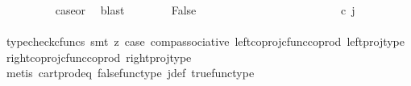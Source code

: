 \begin{isabellebody}
\ \ \ \ \ \ \ \ \isamarkupfalse%
\ case{}{\isacharunderscore}{\kern0pt}or{\isacharunderscore}{\kern0pt}{}\ \isamarkupfalse%
\ blast\isanewline
\ \ \ \ \ \ \isamarkupfalse%
\ False\isanewline
\ \ \ \ \ \ \isamarkupfalse%
\ {\isacharminus}{\kern0pt}\ \isanewline
\ \ \ \ \ \ \ \ \isamarkupfalse%
\ {\isachardoublequoteopen}{\isacharparenleft}{\kern0pt}{\isasymlangle}{\isasymt}{\isacharcomma}{\kern0pt}\ {\isasymt}{\isasymrangle}{\isasymamalg}\ {\isacharparenleft}{\kern0pt}{\isasymlangle}{\isasymf}{\isacharcomma}{\kern0pt}\ {\isasymf}{\isasymrangle}\ {\isasymamalg}{\isasymlangle}{\isasymf}{\isacharcomma}{\kern0pt}\ {\isasymt}{\isasymrangle}{\isacharparenright}{\kern0pt}{\isacharparenright}{\kern0pt}\ {\isasymcirc}\isactrlsub c\ j\ {\isacharequal}{\kern0pt}\ {\isasymlangle}{\isasymf}{\isacharcomma}{\kern0pt}\ {\isasymt}{\isasymrangle}{\isachardoublequoteclose}\isanewline
\ \ \ \ \ \ \ \ \ \ \isamarkupfalse%
\ {\isacharparenleft}{\kern0pt}typecheck{\isacharunderscore}{\kern0pt}cfuncs{\isacharcomma}{\kern0pt}\ smt\ {\isacharparenleft}{\kern0pt}z{}{\isacharparenright}{\kern0pt}\ case{}\ comp{\isacharunderscore}{\kern0pt}associative{}\ left{\isacharunderscore}{\kern0pt}coproj{\isacharunderscore}{\kern0pt}cfunc{\isacharunderscore}{\kern0pt}coprod\ left{\isacharunderscore}{\kern0pt}proj{\isacharunderscore}{\kern0pt}type\ right{\isacharunderscore}{\kern0pt}coproj{\isacharunderscore}{\kern0pt}cfunc{\isacharunderscore}{\kern0pt}coprod\ right{\isacharunderscore}{\kern0pt}proj{\isacharunderscore}{\kern0pt}type{\isacharparenright}{\kern0pt}\isanewline
\ \ \ \ \ \ \ \ \isamarkupfalse%
\ \isamarkupfalse%
\ {\isachardoublequoteopen}{\isasymlangle}{\isasymt}{\isacharcomma}{\kern0pt}\ {\isasymt}{\isasymrangle}\ {\isacharequal}{\kern0pt}\ {\isasymlangle}{\isasymf}{\isacharcomma}{\kern0pt}\ {\isasymt}{\isasymrangle}{\isachardoublequoteclose}\isanewline
\ \ \ \ \ \ \ \ \ \ \isamarkupfalse%
\ {\isacharparenleft}{\kern0pt}metis\ cart{\isacharunderscore}{\kern0pt}prod{\isacharunderscore}{\kern0pt}eq{}\ false{\isacharunderscore}{\kern0pt}func{\isacharunderscore}{\kern0pt}type\ j{\isacharunderscore}{\kern0pt}def\ true{\isacharunderscore}{\kern0pt}func{\isacharunderscore}{\kern0pt}type{\isacharparenright}{\kern0pt}\isanewline
\ \ \ \ \ \ \ \ \isamarkupfalse%
\ \isamarkupfalse%
\ {\isachardoublequoteopen}{\isasymt}\ {\isacharequal}{\kern0pt}\ {\isasymf}{\isachardoublequoteclose}\isanewline

\end{isabellebody}
